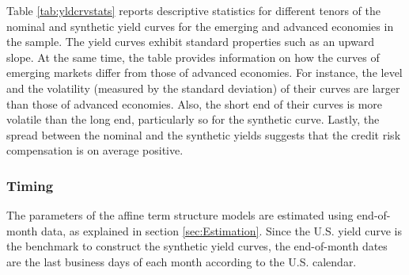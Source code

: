 {Table \ref{tab:yldcrvstats} reports descriptive statistics for different tenors of the nominal and synthetic yield curves for the emerging and advanced economies in the sample. 
The yield curves exhibit standard properties such as an 
upward slope.
At the same time, the table provides information on how the curves of emerging markets differ from those of advanced economies. 
For instance, the level and the volatility (measured by the standard deviation) of their curves %
are larger than those of advanced economies.
Also, the short end of their curves is more volatile than the long end, particularly so for the synthetic curve.
Lastly, the spread between the nominal and the synthetic yields suggests that the credit risk compensation is on average positive. %






\subsubsection{Timing}
The parameters of the affine term structure models are estimated using end-of-month data, as explained in section \ref{sec:Estimation}.
Since the U.S. yield curve is the benchmark to construct the synthetic yield curves, the end-of-month dates are the last business days of each month according to the U.S. calendar.

}
